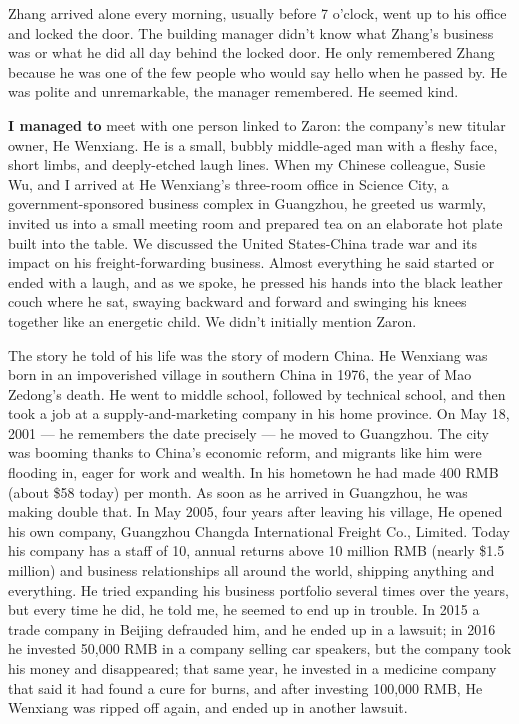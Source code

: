 Zhang arrived alone every morning, usually before 7 o'clock, went up to
his office and locked the door. The building manager didn't know what
Zhang's business was or what he did all day behind the locked door. He
only remembered Zhang because he was one of the few people who would say
hello when he passed by. He was polite and unremarkable, the manager
remembered. He seemed kind.

\textbf{I managed to} meet with one person linked to Zaron: the
company's new titular owner, He Wenxiang. He is a small, bubbly
middle-aged man with a fleshy face, short limbs, and deeply-etched laugh
lines. When my Chinese colleague, Susie Wu, and I arrived at He
Wenxiang's three-room office in Science City, a government-sponsored
business complex in Guangzhou, he greeted us warmly, invited us into a
small meeting room and prepared tea on an elaborate hot plate built into
the table. We discussed the United States-China trade war and its impact
on his freight-forwarding business. Almost everything he said started or
ended with a laugh, and as we spoke, he pressed his hands into the black
leather couch where he sat, swaying backward and forward and swinging
his knees together like an energetic child. We didn't initially mention
Zaron.

The story he told of his life was the story of modern China. He Wenxiang
was born in an impoverished village in southern China in 1976, the year
of Mao Zedong's death. He went to middle school, followed by technical
school, and then took a job at a supply-and-marketing company in his
home province. On May 18, 2001 --- he remembers the date precisely ---
he moved to Guangzhou. The city was booming thanks to China's economic
reform, and migrants like him were flooding in, eager for work and
wealth. In his hometown he had made 400 RMB (about \$58 today) per
month. As soon as he arrived in Guangzhou, he was making double that. In
May 2005, four years after leaving his village, He opened his own
company, Guangzhou Changda International Freight Co., Limited. Today his
company has a staff of 10, annual returns above 10 million RMB (nearly
\$1.5 million) and business relationships all around the world, shipping
anything and everything. He tried expanding his business portfolio
several times over the years, but every time he did, he told me, he
seemed to end up in trouble. In 2015 a trade company in Beijing
defrauded him, and he ended up in a lawsuit; in 2016 he invested 50,000
RMB in a company selling car speakers, but the company took his money
and disappeared; that same year, he invested in a medicine company that
said it had found a cure for burns, and after investing 100,000 RMB, He
Wenxiang was ripped off again, and ended up in another lawsuit.

